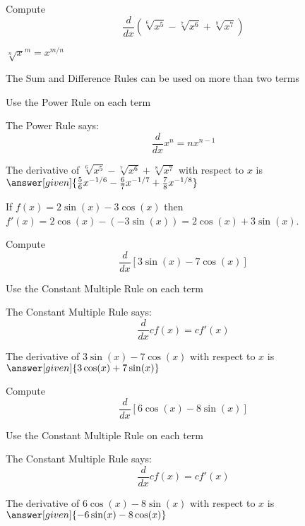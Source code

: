 \documentclass{ximera}
\begin{document}
\begin{problem} %
  Compute 
  \[
  \frac{d}{dx} (\sqrt[6] {x^5} - \sqrt[7] {x^6} + \sqrt[8] {x^7})
  \]
  
    \begin{hint}
		 $\sqrt[n] x^m = x^{m/n}$
		\end{hint}
		\begin{hint}
		  The Sum and Difference Rules can be used on more than two terms
		\end{hint}
		\begin{hint}
      Use the Power Rule on each term
    \end{hint}
    \begin{hint}
      The Power Rule says:
      \[
      \frac{d}{dx} x^n = nx^{n-1}
      \]
    \end{hint}    
		The derivative of $\sqrt[6] {x^5} - \sqrt[7] {x^6} + \sqrt[8] {x^7}$ with respect to $x$ is
		 $\answer[given]{\frac56 x^{-1/6} - \frac67 x^{-1/7} + \frac78 x^{-1/8}}$
	
\end{problem}



\begin{example} %
 If $f(x) = 2\sin(x) - 3\cos(x)$ then $f'(x) = 2\cos(x) - (-3\sin(x)) = 2\cos(x) + 3\sin(x)$.
\end{example}


\begin{problem} %
  Compute 
  \[
  \frac{d}{dx} \left[3\sin(x) - 7\cos(x)\right]
  \]
  
		\begin{hint}
      Use the Constant Multiple Rule on each term
    \end{hint}
    \begin{hint}
      The Constant Multiple Rule says:
      \[
      \frac{d}{dx} cf(x) = cf'(x)
      \]
    \end{hint}    
		The derivative of $3\sin(x) - 7\cos(x)$ with respect to $x$ is
		 $\answer[given]{3\cos(x) + 7\sin(x)}$
	
\end{problem}

\begin{problem} %
  Compute 
  \[
  \frac{d}{dx} \left[6\cos(x) - 8\sin(x)\right]
  \]
  
		\begin{hint}
      Use the Constant Multiple Rule on each term
    \end{hint}
    \begin{hint}
      The Constant Multiple Rule says:
      \[
      \frac{d}{dx} cf(x) = cf'(x)
      \]
    \end{hint}    
		The derivative of $6\cos(x) - 8\sin(x)$ with respect to $x$ is
		 $\answer[given]{-6\sin(x) - 8\cos(x)}$
	
\end{problem}
\end{document}
